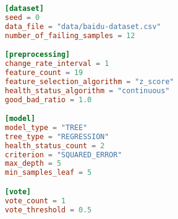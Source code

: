 \begin{lstlisting}[language=Toml,caption={Default configuration file for a Regression Tree}]
[dataset]
seed = 0
data_file = "data/baidu-dataset.csv"
number_of_failing_samples = 12

[preprocessing]
change_rate_interval = 1
feature_count = 19
feature_selection_algorithm = "z_score"
health_status_algorithm = "continuous"
good_bad_ratio = 1.0

[model]
model_type = "TREE"
tree_type = "REGRESSION"
health_status_count = 2
criterion = "SQUARED_ERROR"
max_depth = 5
min_samples_leaf = 5

[vote]
vote_count = 1
vote_threshold = 0.5
\end{lstlisting}